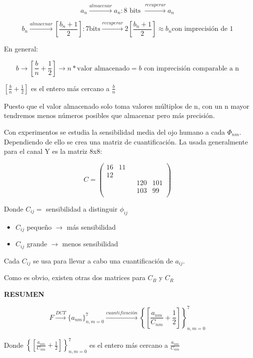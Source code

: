			$$ a_{n} \xrightarrow{almacenar} a_n : 8 \text{ bits } \xrightarrow{recuperar} a_n $$

			$$ b_n \xrightarrow{almacenar} \left[ \frac{b_{n} + 1}{2} \right] : 7 \text{bits} \xrightarrow{recuperar} 2 \left[ \frac{b_n+1}{2} \right] \approx b_n \text{con imprecisión de 1} $$


			En general:

			$$ b \rightarrow \left[ \frac{b}{n} + \frac{1}{2} \right] \rightarrow n * \text{valor almacenado} = b \text{ con imprecisión comparable a n} $$

			$\left[ \frac{b}{n} + \frac{1}{2} \right]$ es el entero más cercano a $\frac{b}{n}$

			Puesto que el valor almacenado solo toma valores múltiplos de n, con un n mayor tendremos menos números posibles que almacenar pero más precisión.


			Con experimentos se estudia la sensibilidad media del ojo humano a cada $\Phi_{nm}$. Dependiendo de ello se crea una matriz de cuantificación. La usada generalmente para el canal Y es la matriz 8x8:


			$$ C = \left(\begin{matrix}
			16 & 11 & & & \\
			12 \\
			& & & 120 & 101 \\
			& & & 103 & 99 \\
			\end{matrix}\right)
			$$

			Donde $C_{ij} = $ sensibilidad a distinguir $\phi_{ij}$
			\begin{itemize}
				\item $C_{ij}$ pequeño $\rightarrow$ más sensibilidad
				\item $C_{ij}$ grande $\rightarrow$ menos sensibilidad
			\end{itemize}

			Cada $C_{ij}$ se usa para llevar a cabo una cuantificación de $a_{ij}$.

			Como es obvio, existen otras dos matrices para $C_B$ y $C_R$

			\begin{framed}
				\textbf{RESUMEN}

				$$ F \xrightarrow{DCT} \{ a_{nm} \}^{7}_{n,m = 0} \xrightarrow{cuantificación} \left\{ \left[ \frac{a_{nm}}{C_{nm}} + \frac{1}{2} \right] \right\}^{7}_{n,m = 0} $$

				Donde $\left\{ \left[ \frac{a_{nm}}{C_{nm}} + \frac{1}{2} \right] \right\}^{7}_{n,m = 0}$ es el entero más cercano a $\frac{a_{nm}}{C_{nm}}$
			\end{framed}


